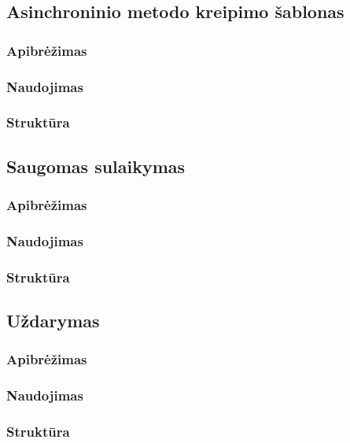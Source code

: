 \documentclass[10pt]{IEEEtran}
\begin{document}
		\subsection{Asinchroninio metodo kreipimo šablonas}

			\subsubsection{Apibrėžimas}

			\subsubsection{Naudojimas}

			\subsubsection{Struktūra}
		
		\subsection{Saugomas sulaikymas}

			\subsubsection{Apibrėžimas}

			\subsubsection{Naudojimas}

			\subsubsection{Struktūra}

		\subsection{Uždarymas}

			\subsubsection{Apibrėžimas}

			\subsubsection{Naudojimas}

			\subsubsection{Struktūra}
\end{document}
